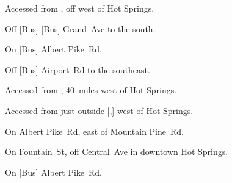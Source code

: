 
\begin{LocationList}

Accessed from , off  west of Hot Springs.

Off [Bus] [Bus] Grand~Ave to the south.

On [Bus] Albert Pike~Rd.

Off [Bus] Airport~Rd to the southeast.

Accessed from , 40~miles west of Hot Springs.

Accessed from  just outside [,] west of Hot Springs.

On  Albert Pike~Rd, east of  Mountain Pine~Rd.

On Fountain~St, off  Central~Ave in downtown Hot Springs.

On [Bus] Albert Pike~Rd.

\end{LocationList}

